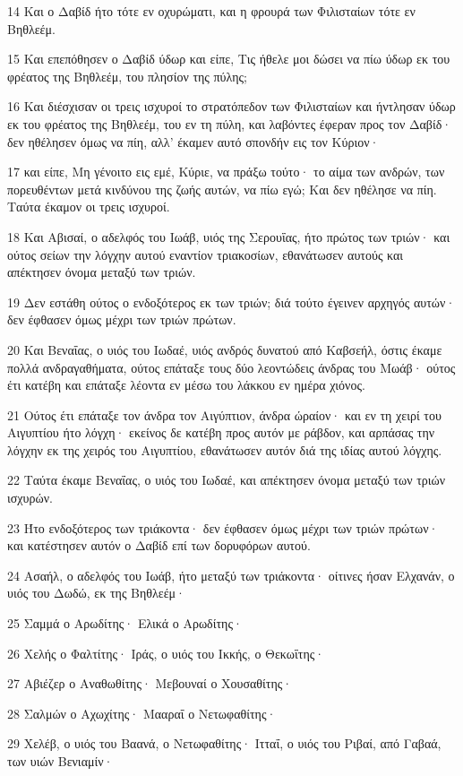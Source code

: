 \par 14 Και ο Δαβίδ ήτο τότε εν οχυρώματι, και η φρουρά των Φιλισταίων τότε εν Βηθλεέμ.
\par 15 Και επεπόθησεν ο Δαβίδ ύδωρ και είπε, Τις ήθελε μοι δώσει να πίω ύδωρ εκ του φρέατος της Βηθλεέμ, του πλησίον της πύλης;
\par 16 Και διέσχισαν οι τρεις ισχυροί το στρατόπεδον των Φιλισταίων και ήντλησαν ύδωρ εκ του φρέατος της Βηθλεέμ, του εν τη πύλη, και λαβόντες έφεραν προς τον Δαβίδ· δεν ηθέλησεν όμως να πίη, αλλ' έκαμεν αυτό σπονδήν εις τον Κύριον·
\par 17 και είπε, Μη γένοιτο εις εμέ, Κύριε, να πράξω τούτο· το αίμα των ανδρών, των πορευθέντων μετά κινδύνου της ζωής αυτών, να πίω εγώ; Και δεν ηθέλησε να πίη. Ταύτα έκαμον οι τρεις ισχυροί.
\par 18 Και Αβισαί, ο αδελφός του Ιωάβ, υιός της Σερουΐας, ήτο πρώτος των τριών· και ούτος σείων την λόγχην αυτού εναντίον τριακοσίων, εθανάτωσεν αυτούς και απέκτησεν όνομα μεταξύ των τριών.
\par 19 Δεν εστάθη ούτος ο ενδοξότερος εκ των τριών; διά τούτο έγεινεν αρχηγός αυτών· δεν έφθασεν όμως μέχρι των τριών πρώτων.
\par 20 Και Βεναΐας, ο υιός του Ιωδαέ, υιός ανδρός δυνατού από Καβσεήλ, όστις έκαμε πολλά ανδραγαθήματα, ούτος επάταξε τους δύο λεοντώδεις άνδρας του Μωάβ· ούτος έτι κατέβη και επάταξε λέοντα εν μέσω του λάκκου εν ημέρα χιόνος.
\par 21 Ούτος έτι επάταξε τον άνδρα τον Αιγύπτιον, άνδρα ώραίον· και εν τη χειρί του Αιγυπτίου ήτο λόγχη· εκείνος δε κατέβη προς αυτόν με ράβδον, και αρπάσας την λόγχην εκ της χειρός του Αιγυπτίου, εθανάτωσεν αυτόν διά της ιδίας αυτού λόγχης.
\par 22 Ταύτα έκαμε Βεναΐας, ο υιός του Ιωδαέ, και απέκτησεν όνομα μεταξύ των τριών ισχυρών.
\par 23 Ήτο ενδοξότερος των τριάκοντα· δεν έφθασεν όμως μέχρι των τριών πρώτων· και κατέστησεν αυτόν ο Δαβίδ επί των δορυφόρων αυτού.
\par 24 Ασαήλ, ο αδελφός του Ιωάβ, ήτο μεταξύ των τριάκοντα· οίτινες ήσαν Ελχανάν, ο υιός του Δωδώ, εκ της Βηθλεέμ·
\par 25 Σαμμά ο Αρωδίτης· Ελικά ο Αρωδίτης·
\par 26 Χελής ο Φαλτίτης· Ιράς, ο υιός του Ικκής, ο Θεκωΐτης·
\par 27 Αβιέζερ ο Αναθωθίτης· Μεβουναί ο Χουσαθίτης·
\par 28 Σαλμών ο Αχωχίτης· Μααραΐ ο Νετωφαθίτης·
\par 29 Χελέβ, ο υιός του Βαανά, ο Νετωφαθίτης· Ιτταΐ, ο υιός του Ριβαί, από Γαβαά, των υιών Βενιαμίν·
